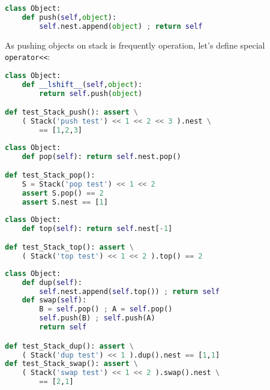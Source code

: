 \clearpage
\begin{lstlisting}[language=Python]
class Object:
	def push(self,object):
		self.nest.append(object) ; return self
\end{lstlisting}

\noindent As pushing objects on stack is frequently operation, let's define
special \verb|operator<<|:
\begin{lstlisting}[language=Python]
class Object:
	def __lshift__(self,object):
		return self.push(object)

def test_Stack_push(): assert \
	( Stack('push test') << 1 << 2 << 3 ).nest \
		== [1,2,3]
\end{lstlisting}
 
\clearpage
\begin{lstlisting}[language=Python]
class Object:
	def pop(self): return self.nest.pop()

def test_Stack_pop():
	S = Stack('pop test') << 1 << 2
	assert S.pop() == 2
	assert S.nest == [1]
\end{lstlisting}

\begin{lstlisting}[language=Python]
class Object:
    def top(self): return self.nest[-1]

def test_Stack_top(): assert \
    ( Stack('top test') << 1 << 2 ).top() == 2
\end{lstlisting}


\clearpage
\begin{lstlisting}[language=Python]
class Object:
	def dup(self):
		self.nest.append(self.top()) ; return self
	def swap(self):
		B = self.pop() ; A = self.pop()
		self.push(B) ; self.push(A)
		return self

def test_Stack_dup(): assert \
    ( Stack('dup test') << 1 ).dup().nest == [1,1]
def test_Stack_swap(): assert \
    ( Stack('swap test') << 1 << 2 ).swap().nest \
    	== [2,1]
\end{lstlisting}
